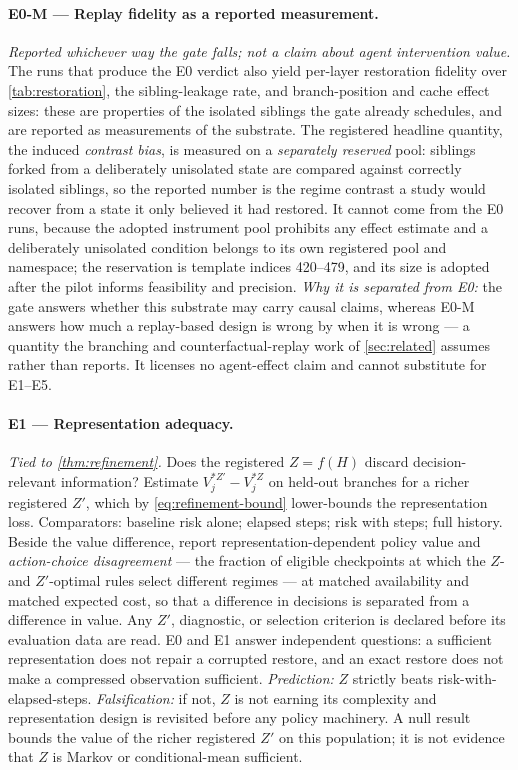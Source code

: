 \paragraph{E0-M --- Replay fidelity as a reported measurement.}
\emph{Reported whichever way the gate falls; not a claim about agent
intervention value.}  The runs that produce the E0 verdict also yield per-layer
restoration fidelity over \cref{tab:restoration}, the sibling-leakage rate, and
branch-position and cache effect sizes: these are properties of the isolated
siblings the gate already schedules, and are reported as measurements of the
substrate.  The registered headline quantity, the induced \emph{contrast bias},
is measured on a \emph{separately reserved} pool: siblings forked from a
deliberately unisolated state are compared against correctly isolated siblings,
so the reported number is the regime contrast a study would recover from a state
it only believed it had restored.  It cannot come from the E0 runs, because the
adopted instrument pool prohibits any effect estimate and a deliberately
unisolated condition belongs to its own registered pool and namespace; the
reservation is template indices 420--479, and its size is adopted after the
pilot informs feasibility and precision.  \emph{Why it is separated from E0:} the gate
answers whether this substrate may carry causal claims, whereas E0-M answers how
much a replay-based design is wrong by when it is wrong --- a quantity the
branching and counterfactual-replay work of \cref{sec:related} assumes rather
than reports.  It licenses no agent-effect claim and cannot substitute for E1--E5.

\paragraph{E1 --- Representation adequacy.}  \emph{Tied to
\cref{thm:refinement}.}  Does the registered $Z=f(H)$ discard decision-relevant
information?  Estimate $V^{*Z'}_j-V^{*Z}_j$ on held-out branches for a richer
registered $Z'$, which by \eqref{eq:refinement-bound} lower-bounds the
representation loss.  Comparators: baseline risk alone; elapsed steps; risk
with steps; full history.  Beside the value difference, report
representation-dependent policy value and \emph{action-choice disagreement} ---
the fraction of eligible checkpoints at which the $Z$- and $Z'$-optimal rules
select different regimes --- at matched availability and matched expected cost,
so that a difference in decisions is separated from a difference in value.  Any
$Z'$, diagnostic, or selection criterion is declared before its evaluation data
are read.  E0 and E1 answer independent questions: a sufficient representation
does not repair a corrupted restore, and an exact restore does not make a
compressed observation sufficient.  \emph{Prediction:} $Z$ strictly beats
risk-with-elapsed-steps.  \emph{Falsification:} if not, $Z$ is not earning its
complexity and representation design is revisited before any policy machinery.
A null result bounds the value of the richer registered $Z'$ on this
population; it is not evidence that $Z$ is Markov or conditional-mean
sufficient.

